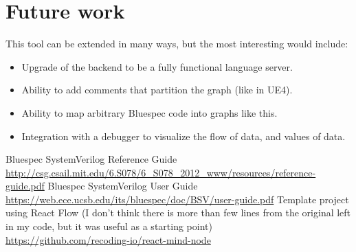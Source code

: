 \documentclass[12pt]{report}
\begin{document}
\section{Future work} 
This tool can be extended in many ways, but the most interesting would include: 
\begin{itemize} 
   \item Upgrade of the backend to be a fully functional language server. 
   \item Ability to add comments that partition the graph (like in UE4).
   \item Ability to map arbitrary Bluespec code into graphs like this. 
   \item Integration with a debugger to visualize the flow of data, and values of data. 
\end{itemize} 
\begin{thebibliography}{9}
   Bluespec SystemVerilog Reference Guide \\
   \href{http://csg.csail.mit.edu/6.S078/6\_S078\_2012\_www/resources/reference-guide.pdf}{http://csg.csail.mit.edu/6.S078/6\_S078\_2012\_www/resources/reference-guide.pdf}
   Bluespec SystemVerilog User Guide \\
   \href{https://web.ece.ucsb.edu/its/bluespec/doc/BSV/user-guide.pdf}{https://web.ece.ucsb.edu/its/bluespec/doc/BSV/user-guide.pdf}
   Template project using React Flow (I don't think there is more than few lines from the original left in my code, but it was useful as a starting point) \\
   \href{https://github.com/recoding-io/react-mind-node}{https://github.com/recoding-io/react-mind-node}
   
   \end{thebibliography}

\end{document}
